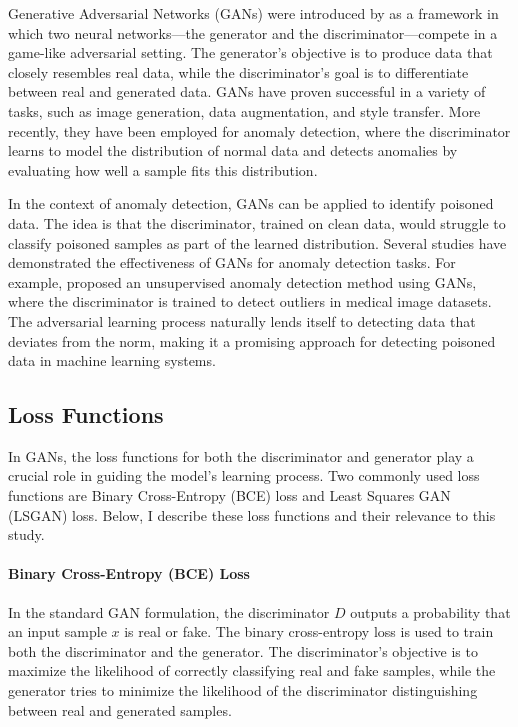 \documentclass[14]{article}
\begin{document}
Generative Adversarial Networks (GANs) were introduced by \citet{goodfell_gan} as a framework in which two neural networks—the generator and the discriminator—compete in a game-like adversarial setting. The generator’s objective is to produce data that closely resembles real data, while the discriminator’s goal is to differentiate between real and generated data. GANs have proven successful in a variety of tasks, such as image generation, data augmentation, and style transfer. More recently, they have been employed for anomaly detection, where the discriminator learns to model the distribution of normal data and detects anomalies by evaluating how well a sample fits this distribution.

In the context of anomaly detection, GANs can be applied to identify poisoned data. The idea is that the discriminator, trained on clean data, would struggle to classify poisoned samples as part of the learned distribution. Several studies have demonstrated the effectiveness of GANs for anomaly detection tasks. For example, \citet{schlegl2017unsupervised} proposed an unsupervised anomaly detection method using GANs, where the discriminator is trained to detect outliers in medical image datasets. The adversarial learning process naturally lends itself to detecting data that deviates from the norm, making it a promising approach for detecting poisoned data in machine learning systems.

\subsection{Loss Functions}

In GANs, the loss functions for both the discriminator and generator play a crucial role in guiding the model’s learning process. Two commonly used loss functions are Binary Cross-Entropy (BCE) loss and Least Squares GAN (LSGAN) loss. Below, I describe these loss functions and their relevance to this study.

\paragraph{Binary Cross-Entropy (BCE) Loss}

In the standard GAN formulation, the discriminator \( D \) outputs a probability that an input sample \( x \) is real or fake. The binary cross-entropy loss is used to train both the discriminator and the generator. The discriminator’s objective is to maximize the likelihood of correctly classifying real and fake samples, while the generator tries to minimize the likelihood of the discriminator distinguishing between real and generated samples.
\end{document}
